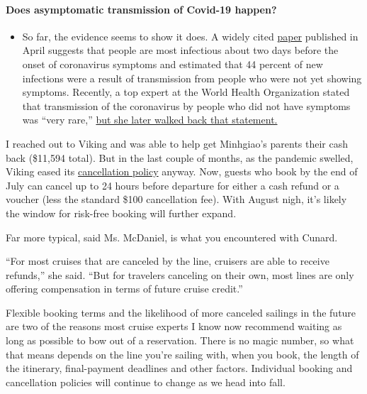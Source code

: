 \begin{itemize}
{  \paragraph{Does asymptomatic transmission of Covid-19
  happen?}\label{does-asymptomatic-transmission-of-covid-19-happen}}

  \begin{itemize}
  \tightlist
  \item
    So far, the evidence seems to show it does. A widely cited
    \href{https://www.nature.com/articles/s41591-020-0869-5}{paper}
    published in April suggests that people are most infectious about
    two days before the onset of coronavirus symptoms and estimated that
    44 percent of new infections were a result of transmission from
    people who were not yet showing symptoms. Recently, a top expert at
    the World Health Organization stated that transmission of the
    coronavirus by people who did not have symptoms was ``very rare,''
    \href{https://www.nytimes.com/2020/06/09/world/coronavirus-updates.html?action=click\&pgtype=Article\&state=default\&region=MAIN_CONTENT_3\&context=storylines_faq\#link-1f302e21}{but
    she later walked back that statement.}
  \end{itemize}
\end{itemize}

I reached out to Viking and was able to help get Minhgiao's parents
their cash back (\$11,594 total). But in the last couple of months, as
the pandemic swelled, Viking eased its
\href{https://www.vikingcruises.com/oceans/risk-free-guarantee.html}{cancellation
policy} anyway. Now, guests who book by the end of July can cancel up to
24 hours before departure for either a cash refund or a voucher (less
the standard \$100 cancellation fee). With August nigh, it's likely the
window for risk-free booking will further expand.

Far more typical, said Ms. McDaniel, is what you encountered with
Cunard.

``For most cruises that are canceled by the line, cruisers are able to
receive refunds,'' she said. ``But for travelers canceling on their own,
most lines are only offering compensation in terms of future cruise
credit.''

Flexible booking terms and the likelihood of more canceled sailings in
the future are two of the reasons most cruise experts I know now
recommend waiting as long as possible to bow out of a reservation. There
is no magic number, so what that means depends on the line you're
sailing with, when you book, the length of the itinerary, final-payment
deadlines and other factors. Individual booking and cancellation
policies will continue to change as we head into fall.

